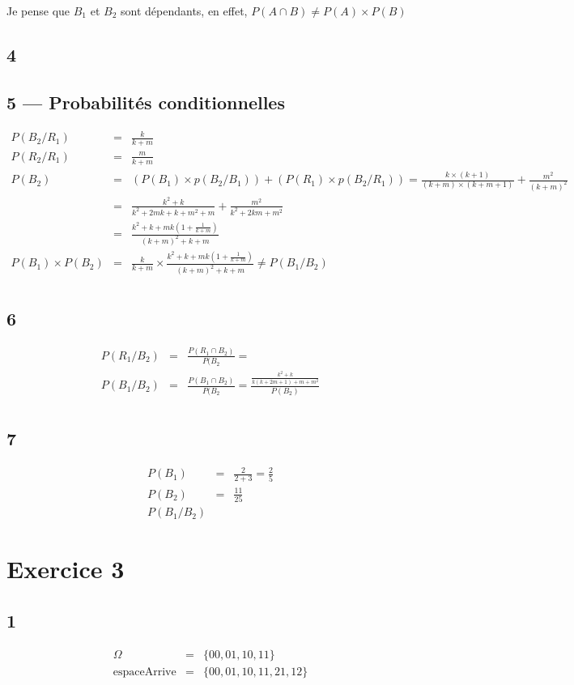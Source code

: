 \documentclass[a4paper, 11pt]{book}
\begin{document}
		Je pense que $B_1$ et $B_2$ sont dépendants, en effet, $P(A\cap B) \neq P(A) \times P(B)$
	\subsection*{4}
	\subsection*{5 --- Probabilités conditionnelles}
\begin{eqnarray*}
	P(B_2/R_1) &=& \frac{k}{k+m}\\
	P(R_2/R_1) &=& \frac{m}{k+m}\\
	P(B_2) &=& (P(B_1) \times p(B_2/B_1)) + (P(R_1) \times p(B_2/R_1)) = \frac{k \times (k+1)}{(k+m) \times (k+m+1)}  + \frac{m^2}{(k+m)^2}\\
	&=& \frac{k^2+k}{k^2+2mk+k+m^2+m} + \frac{m^2}{k^2+2km+m^2}\\
	&=& \frac{k^2+k+mk(1+\frac{1}{k+m})}{(k+m)^2+k+m}\\
	P(B_1) \times P(B_2) &=& \frac{k}{k+m} \times \frac{k^2+k+mk(1+\frac{1}{k+m})}{(k+m)^2+k+m} \neq P(B_1/B_2)\\
\end{eqnarray*}
\subsection*{6}
\begin{eqnarray*}
	P(R_1/B_2) &=& \frac{P(R_1\cap B_2)}{P(B_2} = \\
	P(B_1/B_2) &=& \frac{P(B_1\cap B_2)}{P(B_2} =  \frac{\frac{k^2+k}{k(k+2m+1)+m+m^2}}{P(B_2)} \\ 
\end{eqnarray*}
\subsection*{7}
\begin{eqnarray*}
	P(B_1) &=&  \frac{2}{2+3} = \frac{2}{5}\\
	P(B_2) &=&  \frac{11}{25}\\
	P(B_1/B_2) 
\end{eqnarray*}
	\section*{Exercice 3}
	\subsection*{1}
	\begin{eqnarray*}
		\Omega&=&\{00,01,10,11\}\\
		\textrm{espaceArrive} &=& \{00,01,10,11,21,12\}
	\end{eqnarray*}
\end{document}
